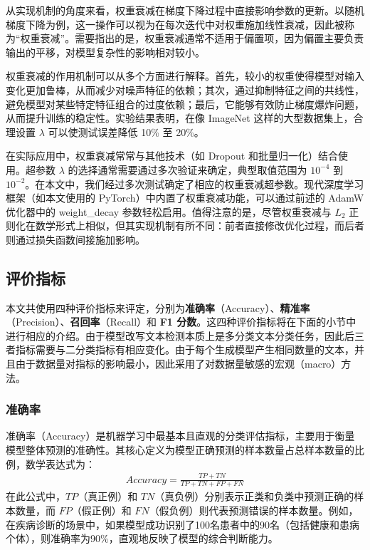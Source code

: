 从实现机制的角度来看，权重衰减在梯度下降过程中直接影响参数的更新。以随机梯度下降为例，这一操作可以视为在每次迭代中对权重施加线性衰减，因此被称为“权重衰减”。需要指出的是，权重衰减通常不适用于偏置项，因为偏置主要负责输出的平移，对模型复杂性的影响相对较小。

权重衰减的作用机制可以从多个方面进行解释。首先，较小的权重使得模型对输入变化更加鲁棒，从而减少对噪声特征的依赖；其次，通过抑制特征之间的共线性，避免模型对某些特定特征组合的过度依赖；最后，它能够有效防止梯度爆炸问题，从而提升训练的稳定性。实验结果表明，在像 ImageNet 这样的大型数据集上，合理设置 \(\lambda\) 可以使测试误差降低 10\% 至 20\%。

在实际应用中，权重衰减常常与其他技术（如 Dropout 和批量归一化）结合使用。超参数 \(\lambda\) 的选择通常需要通过多次验证来确定，典型取值范围为 \(10^{-4}\) 到 \(10^{-2}\)。在本文中，我们经过多次测试确定了相应的权重衰减超参数。现代深度学习框架（如本文使用的 PyTorch）中内置了权重衰减功能，可以通过前述的 AdamW 优化器中的 weight\_decay 参数轻松启用。值得注意的是，尽管权重衰减与 \( L_2 \) 正则化在数学形式上相似，但其实现机制有所不同：前者直接修改优化过程，而后者则通过损失函数间接施加影响。

\subsection{评价指标}
\label{sec:method-experiment-metric}

本文共使用四种评价指标来评定，分别为\textbf{准确率}（Accuracy）、\textbf{精准率}（Precision）、\textbf{召回率}（Recall）和 \textbf{F1 分数}。这四种评价指标将在下面的小节中进行相应的介绍。由于模型改写文本检测本质上是多分类文本分类任务，因此后三者指标需要与二分类指标有相应变化。由于每个生成模型产生相同数量的文本，并且由于数据量对指标的影响最小，因此采用了对数据量敏感的宏观（macro）方法。

\subsubsection{准确率}

准确率（Accuracy）是机器学习中最基本且直观的分类评估指标，主要用于衡量模型整体预测的准确性。其核心定义为模型正确预测的样本数量占总样本数量的比例，数学表达式为：
\begin{align}
    Accuracy = \frac{TP+TN}{TP+TN+FP+FN}
\end{align}
在此公式中，\(TP\)（真正例）和 \(TN\)（真负例）分别表示正类和负类中预测正确的样本数量，而 \(FP\)（假正例）和 \(FN\)（假负例）则代表预测错误的样本数量。例如，在疾病诊断的场景中，如果模型成功识别了100名患者中的90名（包括健康和患病个体），则准确率为90\%，直观地反映了模型的综合判断能力。

